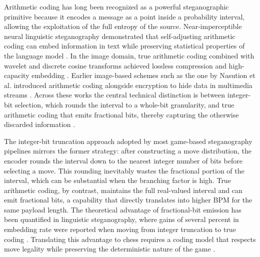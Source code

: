 \documentclass[journal]{IEEEtran}
\begin{document}
Arithmetic coding has long been recognized as a powerful steganographic primitive because it encodes a message as a point inside a probability interval, allowing the exploitation of the full entropy of the source. Near-imperceptible neural linguistic steganography demonstrated that self-adjusting arithmetic coding can embed information in text while preserving statistical properties of the language model . In the image domain, true arithmetic coding combined with wavelet and discrete cosine transforms achieved lossless compression and high-capacity embedding . Earlier image-based schemes such as the one by Nasution et al. introduced arithmetic coding alongside encryption to hide data in multimedia streams . Across these works the central technical distinction is between integer-bit selection, which rounds the interval to a whole-bit granularity, and true arithmetic coding that emits fractional bits, thereby capturing the otherwise discarded information \cite{shen2020nearimpercepti, baraskar2018truecolor, nasution2018imagesteganogr} \cite{shen2020nearimpercepti, baraskar2018truecolor, nasution2018imagesteganogr}.

The integer-bit truncation approach adopted by most game-based steganography pipelines mirrors the former strategy: after constructing a move distribution, the encoder rounds the interval down to the nearest integer number of bits before selecting a move. This rounding inevitably wastes the fractional portion of the interval, which can be substantial when the branching factor is high. True arithmetic coding, by contrast, maintains the full real-valued interval and can emit fractional bits, a capability that directly translates into higher BPM for the same payload length. The theoretical advantage of fractional-bit emission has been quantified in linguistic steganography, where gains of several percent in embedding rate were reported when moving from integer truncation to true coding . Translating this advantage to chess requires a coding model that respects move legality while preserving the deterministic nature of the game \cite{shen2020nearimpercepti} \cite{shen2020nearimpercepti}.
\end{document}
